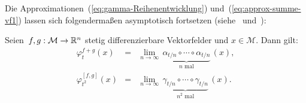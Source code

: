 Die Approximationen~(\ref{eq:gamma-Reihenentwicklung}) und~(\ref{eq:approx-summe-vf1})
lassen sich folgendermaßen asymp\-to\-tisch fortsetzen (siehe~\cite[Corollary~{2.12.5}]{varadarajan1984}
und~\cite[Proposition~{1.9}]{jakubczyk2001course}):
\begin{proposition}
Seien~$f,g:\mathcal{M}\to{\mathbb{R}}^{n}$ stetig differenzierbare Vektorfelder
und $x\in\mathcal{M}$. Dann gilt:
\[
\begin{array}{lcl}
\varphi_{t}^{f+g}(x) & = & \lim\limits _{n\to\infty}\,\underbrace{\alpha_{t/n}\circ\cdots\circ\alpha_{t/n}}_{{\displaystyle n\mbox{ mal}}}\,(x),\\
\varphi_{t^{2}}^{[f,g]}(x) & = & \lim\limits _{n\to\infty}\,\underbrace{\gamma_{t/n}\circ\cdots\circ\gamma_{t/n}}_{{\displaystyle n^{2}\mbox{ mal}}}\,(x).
\end{array}
\]
\end{proposition}

